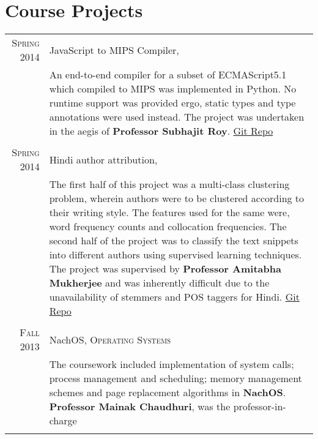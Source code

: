 \documentclass[a4paper,10pt]{article} %
\begin{document}
\section{Course Projects}

\begin{tabular}{r|p{11cm}}

    \textsc{Spring 2014} & JavaScript to MIPS Compiler, \textsc{\raggedright Compilers} \\
                         & \footnotesize{An end-to-end compiler for a subset of ECMAScript5.1
                            which compiled to MIPS was implemented in Python. No runtime support
                            was provided ergo, static types and type annotations were used instead.
                            The project was undertaken in the aegis of \textbf{Professor Subhajit Roy}.
                            \href{https://github.com/srijanshetty/javascript-compiler} {Git Repo}} \\
                            \\

    \textsc{Spring 2014} & Hindi author attribution, \textsc{\raggedright Artificial Intelligence} \\
                         & \footnotesize{The first half of this project was a multi-class clustering problem,
                            wherein authors were to be clustered according to their writing style.
                            The features used for the same were, word frequency counts and collocation
                            frequencies.  The second half of the project was to classify the text snippets
                            into different authors using supervised learning techniques.
                            The project was supervised by \textbf{Professor Amitabha Mukherjee} and was
                            inherently difficult due to the unavailability of stemmers and POS taggers for Hindi.
                            \href{https://github.com/srijanshetty/author-attribution} {Git Repo}}\\
                            \\

    \textsc{Fall 2013} & NachOS, \textsc{Operating Systems} \\
                       & \footnotesize{The coursework included implementation of system calls; process
                          management and scheduling; memory management schemes and page replacement
                          algorithms in \textbf{NachOS}. \textbf{Professor Mainak Chaudhuri}, was
                          the professor-in-charge}\\
                          \\


\end{tabular}
\end{document}
